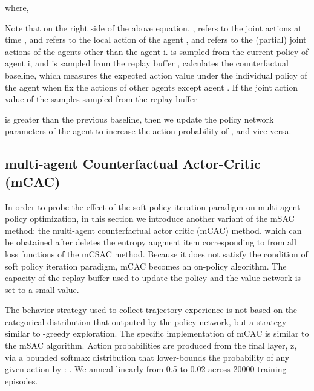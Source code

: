 \documentclass[runningheads]{llncs}
\begin{document}
where,
\begin{small}
	
\end{small}


Note that on the right side of the above equation, ,  refers to the joint actions at time , and  refers to the local action of the agent , and  refers to the (partial) joint actions of the agents other than the agent i.  is sampled from the current policy  of agent i, and  is sampled from the replay buffer  ,
  calculates the counterfactual baseline, which measures the expected action value under the individual policy of the agent  when fix the actions of other agents except agent . If the joint action value of the samples sampled from the replay buffer 
 
is greater than the previous baseline, then we update the policy network parameters of the agent  to increase the action probability of , and vice versa.





\subsection{multi-agent Counterfactual Actor-Critic (mCAC)}
In order to probe the effect of the soft policy iteration paradigm on multi-agent policy optimization, in this section we introduce another variant of the mSAC method: the multi-agent counterfactual actor critic (mCAC) method. 
which can be obatained after deletes the entropy augment item corresponding to  from all loss functions of the mCSAC method. Because it does not satisfy the condition of soft policy iteration paradigm, mCAC becomes an on-policy algorithm. The capacity of the replay buffer used to update the policy and the value network is set to a small value.

The behavior strategy used to collect trajectory experience is not based on the categorical distribution that outputed by the policy network, but a strategy similar to -greedy exploration.
The specific implementation of mCAC is similar to the mSAC algorithm. 
Action probabilities are produced from the final layer, z, via a bounded softmax distribution that lower-bounds the probability of any given action by :
. We anneal  linearly
from 0.5 to 0.02 across 20000 training episodes.
\end{document}
